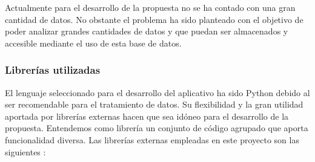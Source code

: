 Actualmente para el desarrollo de la propuesta no se ha contado con una gran cantidad de datos.
No obstante el problema ha sido planteado con el objetivo de poder analizar grandes cantidades de datos y que puedan
ser almacenados y accesible mediante el uso de esta base de datos.

\subsubsection{Librerías utilizadas} \label{subsection: LibreriasExternas}
El lenguaje seleccionado para el desarrollo del aplicativo ha sido Python debido al ser recomendable para el tratamiento de datos. Su flexibilidad y la gran utilidad aportada por librerías externas hacen que sea idóneo para el desarrollo de la propuesta. Entendemos como librería un conjunto de código agrupado que aporta funcionalidad diversa. Las librerías externas empleadas en este proyecto son las siguientes :

